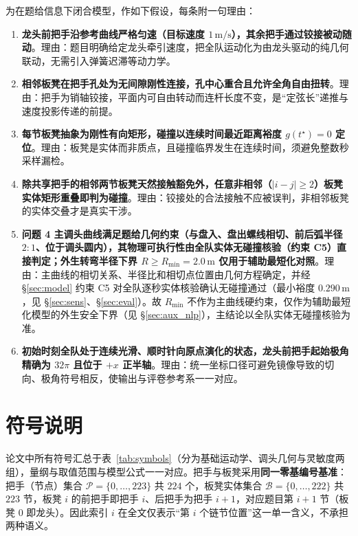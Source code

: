 \documentclass[a4paper, 12pt]{ctexart}
\begin{document}
为在题给信息下闭合模型，作如下假设，每条附一句理由：

\begin{enumerate}[label=(\arabic*)]
  \item \textbf{龙头前把手沿参考曲线严格匀速（目标速度 $1\,\mathrm{m/s}$），其余把手通过铰接被动随动}。理由：题目明确给定龙头牵引速度，把全队运动化为由龙头驱动的纯几何联动，无需引入弹簧迟滞等动力学。
  \item \textbf{相邻板凳在把手孔处为无间隙刚性连接，孔中心重合且允许全角自由扭转}。理由：把手为销轴铰接，平面内可自由转动而连杆长度不变，是“定弦长”递推与速度投影传递的前提。
  \item \textbf{每节板凳抽象为刚性有向矩形，碰撞以连续时间最近距离裕度 $g(t^\star)=0$ 定位}。理由：板凳是实体而非质点，且碰撞临界发生在连续时间，须避免整数秒采样漏检。
  \item \textbf{除共享把手的相邻两节板凳天然接触豁免外，任意非相邻（$|i-j|\ge2$）板凳实体矩形重叠即判为碰撞}。理由：铰接处的合法接触不应被误判，非相邻板凳的实体交叠才是真实干涉。
  \item \textbf{问题 4 主调头曲线满足题给几何约束（与盘入、盘出螺线相切、前后弧半径 $2{:}1$、位于调头圆内），其物理可执行性由全队实体无碰撞核验（约束 C5）直接判定；外生转弯半径下界 $R\ge R_{\min}=2.0\,\mathrm{m}$ 仅用于辅助最短化对照}。理由：主曲线的相切关系、半径比和相切点位置由几何方程确定，并经 §\ref{sec:model} 约束 C5 对全队逐秒实体核验确认无碰撞通过（最小裕度 $0.290\,\mathrm{m}$，见 §\ref{sec:sens}、§\ref{sec:eval}）。故 $R_{\min}$ 不作为主曲线硬约束，仅作为辅助最短化模型的外生安全下界（见 §\ref{sec:aux_nlp}），主结论以全队实体无碰撞核验为准。
  \item \textbf{初始时刻全队处于连续光滑、顺时针向原点演化的状态，龙头前把手起始极角精确为 $32\pi$ 且位于 $+x$ 正半轴}。理由：统一坐标口径可避免镜像导致的切向、极角符号相反，使输出与评卷参考系一一对应。
\end{enumerate}

\section{符号说明}

论文中所有符号汇总于表~\ref{tab:symbols}（分为基础运动学、调头几何与灵敏度两组），量纲与取值范围与模型公式一一对应。把手与板凳采用\textbf{同一零基编号基准}：把手（节点）集合 $\mathcal{P}=\{0,\dots,223\}$ 共 $224$ 个，板凳实体集合 $\mathcal{B}=\{0,\dots,222\}$ 共 $223$ 节，板凳 $i$ 的前把手即把手 $i$、后把手为把手 $i{+}1$，对应题目第 $i{+}1$ 节（板凳 $0$ 即龙头）。因此索引 $i$ 在全文仅表示“第 $i$ 个链节位置”这一单一含义，不承担两种语义。
\end{document}
